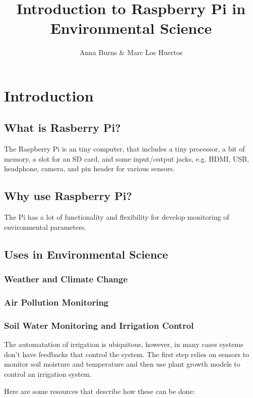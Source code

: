 \documentclass{article}\usepackage[]{graphicx}\usepackage[]{color}
\author{Anna Burns \& Marc Los Huertos}
\title{Introduction to Raspberry Pi in Environmental Science}
\begin{document}
\maketitle

\section{Introduction}

\subsection{What is Rasberry Pi?}

The Raspberry Pi is an tiny computer, that includes a tiny processor, a bit of memory, a slot for an SD card, and some input/output jacks, e.g. HDMI, USB, headphone, camera, and pin header for various sensors.

\subsection{Why use Raspberry Pi?}

The Pi has a lot of functionality and flexibility for develop monitoring of environmental parameters. 

\subsection{Uses in Environmental Science}

\subsubsection{Weather and Climate Change}

\subsubsection{Air Pollution Monitoring}

\subsubsection{Soil Water Monitoring and Irrigation Control}

The automatation of irrigation is ubiquitous, however, in many cases systems don't have feedbacks that control the system. The first step relies on sensors to monitor soil moisture and temperature and then use plant growth models to control an irrigation system. 

Here are some resources that describe how these can be done:
\end{document}
